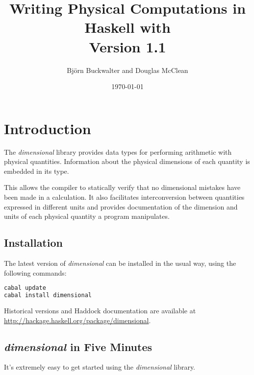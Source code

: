 \documentclass[11pt]{report}
\title{
	{Writing Physical Computations in Haskell with \thispackage}\\
	{\small{Version 1.1}}
}
\author{Björn Buckwalter and Douglas McClean}
\date{\today}
\newcommand{\packagename}[1]{\textit{#1}}
\newcommand{\thispackage}{\packagename{dimensional}}
\begin{document}
\maketitle

\tableofcontents

\chapter{Introduction}

The \thispackage{} library provides data types for performing arithmetic with physical
quantities. Information about the physical dimensions of each quantity is embedded in
its type.

This allows the compiler to statically verify that no dimensional mistakes have been
made in a calculation. It also facilitates interconversion between quantities expressed
in different units and provides documentation of the dimension and units of each physical
quantity a program manipulates.

\section{Installation}

The latest version of \thispackage{} can be installed in the usual way, using the following commands:

\begin{lstlisting}[language=bash]
cabal update
cabal install dimensional
\end{lstlisting}

Historical versions and Haddock documentation are available at \url{http://hackage.haskell.org/package/dimensional}.

\section{\thispackage{} in Five Minutes}

It's extremely easy to get started using the \thispackage{} library.
\end{document}
